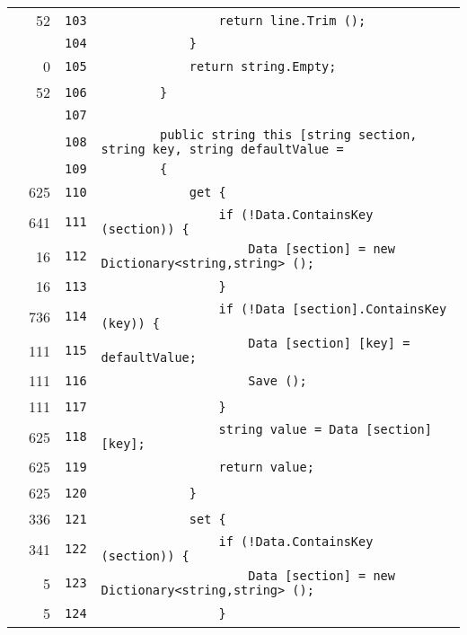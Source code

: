 \documentclass[a4paper,10pt]{article}
\begin{document}
\begin{longtable}[l]{lrrl}
\cellcolor{green} & 52 & \verb~103~ & \verb~                return line.Trim ();~\\
\cellcolor{gray} &  & \verb~104~ & \verb~            }~\\
\cellcolor{red} & 0 & \verb~105~ & \verb~            return string.Empty;~\\
\cellcolor{green} & 52 & \verb~106~ & \verb~        }~\\
\cellcolor{gray} &  & \verb~107~ & \verb~~\\
\cellcolor{gray} &  & \verb~108~ & \verb~        public string this [string section, string key, string defaultValue = ~\\
\cellcolor{gray} &  & \verb~109~ & \verb~        {~\\
\cellcolor{green} & 625 & \verb~110~ & \verb~            get {~\\
\cellcolor{green} & 641 & \verb~111~ & \verb~                if (!Data.ContainsKey (section)) {~\\
\cellcolor{green} & 16 & \verb~112~ & \verb~                    Data [section] = new Dictionary<string,string> ();~\\
\cellcolor{green} & 16 & \verb~113~ & \verb~                }~\\
\cellcolor{green} & 736 & \verb~114~ & \verb~                if (!Data [section].ContainsKey (key)) {~\\
\cellcolor{green} & 111 & \verb~115~ & \verb~                    Data [section] [key] = defaultValue;~\\
\cellcolor{green} & 111 & \verb~116~ & \verb~                    Save ();~\\
\cellcolor{green} & 111 & \verb~117~ & \verb~                }~\\
\cellcolor{green} & 625 & \verb~118~ & \verb~                string value = Data [section] [key];~\\
\cellcolor{green} & 625 & \verb~119~ & \verb~                return value;~\\
\cellcolor{green} & 625 & \verb~120~ & \verb~            }~\\
\cellcolor{green} & 336 & \verb~121~ & \verb~            set {~\\
\cellcolor{green} & 341 & \verb~122~ & \verb~                if (!Data.ContainsKey (section)) {~\\
\cellcolor{green} & 5 & \verb~123~ & \verb~                    Data [section] = new Dictionary<string,string> ();~\\
\cellcolor{green} & 5 & \verb~124~ & \verb~                }~\\

\end{longtable}
\end{document}
